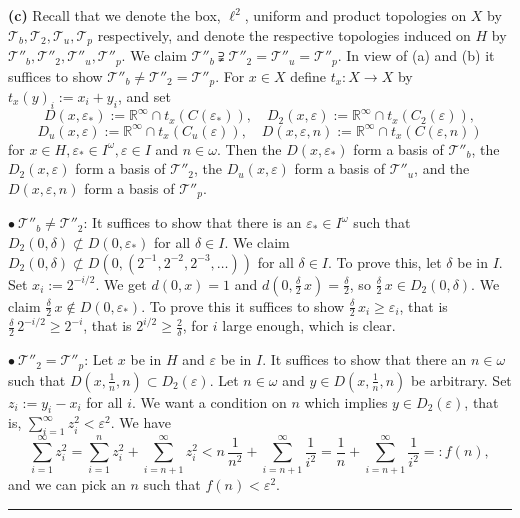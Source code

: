 \documentclass[12pt,letterpaper]{article}
\newcommand{\eps}{\varepsilon}
\newcommand{\noi}{\noindent}%
\newcommand{\R}{\mathbb R}
\newcommand{\T}{\mathcal T}
\begin{document}
\noi\textbf{(c)} Recall that we denote the box, $\ell^2$, uniform and product topologies on $X$ by $\T_b,\T_2,\T_u,\T_p$ respectively, and denote the respective topologies induced on $H$ by $\T''_b,\T''_2,\T''_u,\T''_p$. We claim $\T''_b\supsetneqq\T''_2=\T''_u=\T''_p$. In view of (a) and (b) it suffices to show $\T''_b\ne\T''_2=\T''_p$. For $x\in X$ define $t_x:X\to X$ by $t_x(y)_i:=x_i+y_i$, and set 
$$
D(x,\eps_*):=\R^\infty\cap t_x(C(\eps_*)),\quad D_2(x,\eps):=\R^\infty\cap t_x(C_2(\eps)),
$$ 
$$
D_u(x,\eps):=\R^\infty\cap t_x(C_u(\eps)),\quad D(x,\eps,n):=\R^\infty\cap t_x(C(\eps,n))
$$ 
for $x\in H,\eps_*\in I^\omega,\eps\in I$ and $n\in\omega$. Then the $D(x,\eps_*)$ form a basis of $\T''_b$, the $D_2(x,\eps)$ form a basis of $\T''_2$, the $D_u(x,\eps)$ form a basis of $\T''_u$, and the $D(x,\eps,n)$ form a basis of $\T''_p$. 

\noi$\bullet\ \T''_b\ne\T''_2$: It suffices to show that there is an $\eps_*\in I^\omega$ such that $D_2(0,\delta)\not\subset D(0,\eps_*)$ for all $\delta\in I$. We claim $D_2(0,\delta)\not\subset D(0,(2^{-1},2^{-2},2^{-3},\ldots))$ for all $\delta\in I$. To prove this, let $\delta$ be in $I$. Set $x_i:=2^{-i/2}$. We get $d(0,x)=1$ and $d(0,\frac\delta2\,x)= \frac\delta2$, so $\frac\delta2\,x\in D_2(0,\delta)$. We claim $\frac\delta2\,x\notin D(0,\eps_*)$. To prove this it suffices to show $\frac\delta2\,x_i\ge\eps_i$, that is $\frac\delta2\,2^{-i/2}\ge2^{-i}$, that is $2^{i/2}\ge\frac2\delta$, for $i$ large enough, which is clear. 

\noi$\bullet\ \T''_2=\T''_p$: Let $x$ be in $H$ and $\eps$ be in $I$. It suffices to show that there an $n\in\omega$ such that $D(x,\frac1n,n)\subset D_2(\eps)$. Let $n\in\omega$ and $y\in D(x,\frac1n,n)$ be arbitrary. Set $z_i:=y_i-x_i$ for all $i$. We want a condition on $n$ which implies $y\in D_2(\eps)$, that is, $\sum_{i=1}^\infty z_i^2<\eps^2$. We have 
$$
\sum_{i=1}^\infty z_i^2=\sum_{i=1}^nz_i^2+\sum_{i=n+1}^\infty z_i^2<n\,\frac1{n^2}+\sum_{i=n+1}^\infty\frac1{i^2}=\frac1n+\sum_{i=n+1}^\infty\frac1{i^2}=:f(n),
$$ 
and we can pick an $n$ such that $f(n)<\eps^2$. 

\bigskip\bigskip\hrule\bigskip
\end{document}
